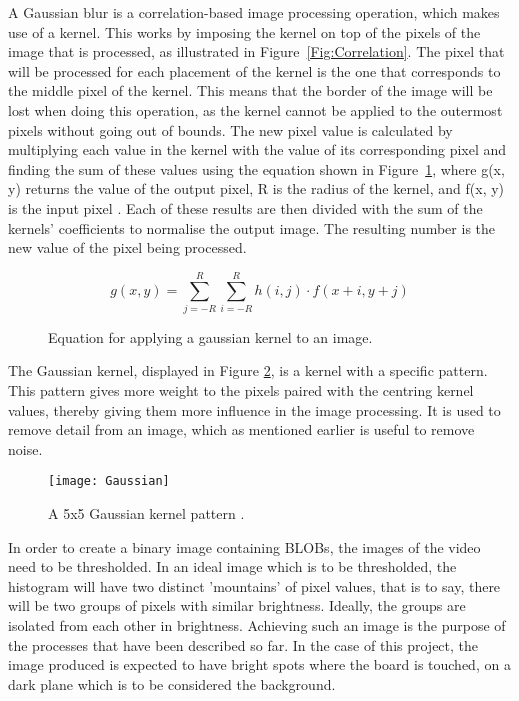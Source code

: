 A Gaussian blur is a correlation-based image processing operation, which makes use of a kernel. This works by imposing the kernel on top of the pixels of the image that is processed, as illustrated in Figure~\ref{Fig:Correlation}. The pixel that will be processed for each placement of the kernel is the one that corresponds to the middle pixel of the kernel. This means that the border of the image will be lost when doing this operation, as the kernel cannot be applied to the outermost pixels without going out of bounds. The new pixel value is calculated by multiplying each value in the kernel with the value of its corresponding pixel and finding the sum of these values using the equation shown in Figure~\ref{fig:gaussianEquation}, where g(x, y) returns the value of the output pixel, R is the radius of the kernel, and f(x, y) is the input pixel \citep{moeslund_introduction_2012}. Each of these results are then divided with the sum of the kernels' coefficients to normalise the output image. The resulting number is the new value of the pixel being processed.

\begin{figure}[!h]
	\centering
	\begin{displaymath}
	g(x,y) = \sum^R_{j=-R} \sum^R_{i=-R} h(i, j) \cdot f(x + i, y + j)
	\end{displaymath}
	\caption{Equation for applying a gaussian kernel to an image. \label{fig:gaussianEquation}}
\end{figure}

The Gaussian kernel, displayed in Figure \ref{Fig:Gaussian}, is a kernel with a specific pattern. This pattern gives more weight to the pixels paired with the centring kernel values, thereby giving them more influence in the image processing. It is used to remove detail from an image, which as mentioned earlier is useful to remove noise.

\begin{figure}[h]
\begin{center}
 \texttt{[image: Gaussian]}
  \end{center}
\caption{A 5x5 Gaussian kernel pattern \label{Fig:Gaussian}\citep{moeslund_introduction_2012}.}
\end{figure}

In order to create a binary image containing BLOBs, the images of the video need to be thresholded. In an ideal image which is to be thresholded, the histogram will have two distinct 'mountains' of pixel values, that is to say, there will be two groups of pixels with similar brightness. Ideally, the groups are isolated from each other in brightness. Achieving such an image is the purpose of the processes that have been described so far. In the case of this project, the image produced is expected to have bright spots where the board is touched, on a dark plane which is to be considered the background.

